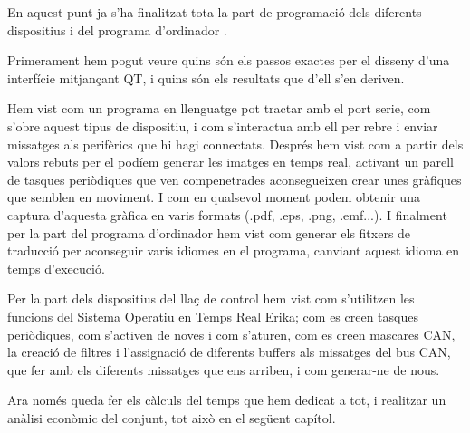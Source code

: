 En aquest punt ja s'ha finalitzat tota la part de programació dels diferents dispositius i del programa d'ordinador \DCSMonitor. 

Primerament hem pogut veure quins són els passos exactes per el disseny d'una interfície mitjançant QT, i quins són els resultats que d'ell s'en deriven.

Hem vist com un programa en llenguatge \Python pot tractar amb el port serie, com s'obre aquest tipus de dispositiu, i com s'interactua amb ell per rebre i enviar missatges als perifèrics que hi hagi connectats. Després hem vist com a partir dels valors rebuts per el \Monitor podíem generar les imatges en temps real, activant un parell de tasques periòdiques que ven compenetrades aconsegueixen crear unes gràfiques que semblen en moviment. I com en qualsevol moment podem obtenir una captura d'aquesta gràfica en varis formats (.pdf, .eps, .png, .emf...). I finalment per la part del programa d'ordinador hem vist com generar els fitxers de traducció per aconseguir varis idiomes en el programa, canviant aquest idioma en temps d'execució.

Per la part dels dispositius del llaç de control hem vist com s'utilitzen les funcions del Sistema Operatiu en Temps Real Erika; com es creen tasques periòdiques, com s'activen de noves i com s'aturen,  com es creen mascares CAN, la creació de filtres i l'assignació de diferents buffers als missatges del bus CAN, que fer amb els diferents missatges que ens arriben, i com generar-ne de nous.

Ara només queda fer els càlculs del temps que hem dedicat a tot, i realitzar un anàlisi econòmic del conjunt, tot això en el següent capítol.

